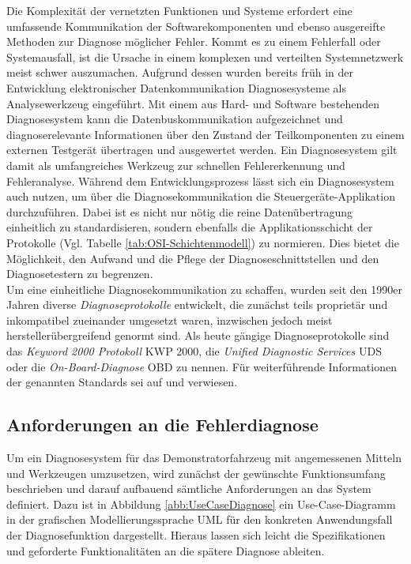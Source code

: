 Die Komplexität der vernetzten Funktionen und Systeme erfordert eine umfassende Kommunikation der Softwarekomponenten und ebenso ausgereifte Methoden zur Diagnose möglicher Fehler. Kommt es zu einem Fehlerfall oder Systemausfall, ist die Ursache in einem komplexen und verteilten Systemnetzwerk meist schwer auszumachen. Aufgrund dessen wurden bereits früh in der Entwicklung elektronischer Datenkommunikation Diagnosesysteme als Analysewerkzeug eingeführt. Mit einem aus Hard- und Software bestehenden Diagnosesystem kann die Datenbuskommunikation aufgezeichnet und diagnoserelevante Informationen über den Zustand der Teilkomponenten zu einem externen Testgerät übertragen und ausgewertet werden. Ein Diagnosesystem gilt damit als umfangreiches Werkzeug zur schnellen Fehlererkennung und Fehleranalyse. Während dem Entwicklungsprozess lässt sich ein Diagnosesystem auch nutzen, um über die Diagnosekommunikation die Steuergeräte-Applikation durchzuführen. Dabei ist es nicht nur nötig die reine Datenübertragung einheitlich zu standardisieren, sondern ebenfalls die Applikationsschicht der Protokolle (Vgl. Tabelle \ref{tab:OSI-Schichtenmodell}) zu normieren. Dies bietet die Möglichkeit, den Aufwand und die Pflege der Diagnoseschnittstellen und den Diagnosetestern zu begrenzen. \\
Um eine einheitliche Diagnosekommunikation zu schaffen, wurden seit den 1990er Jahren diverse \emph{Diagnoseprotokolle} entwickelt, die zunächst teils proprietär und inkompatibel zueinander umgesetzt waren, inzwischen jedoch meist herstellerübergreifend genormt sind. Als heute gängige Diagnoseprotokolle sind das \emph{Keyword 2000 Protokoll} \acs{KWP} 2000, die \emph{Unified Diagnostic Services} \acs{UDS} oder die \emph{On-Board-Diagnose} \acs{OBD} zu nennen. Für weiterführende Informationen der genannten Standards sei auf \cite{Zimmermann.2014} und \cite{Schaffer.2012} verwiesen.

\subsection{Anforderungen an die Fehlerdiagnose}
\label{subsec:AnforderungenDiagnose}

Um ein Diagnosesystem für das Demonstratorfahrzeug mit angemessenen Mitteln und Werkzeugen umzusetzen, wird zunächst der gewünschte Funktionsumfang beschrieben und darauf aufbauend sämtliche Anforderungen an das System definiert.
Dazu ist in Abbildung \ref{abb:UseCaseDiagnose} ein Use-Case-Diagramm in der grafischen Modellierungssprache \acs{UML} für den konkreten Anwendungsfall der Diagnosefunktion dargestellt. Hieraus lassen sich leicht die Spezifikationen und geforderte Funktionalitäten an die spätere Diagnose ableiten.

